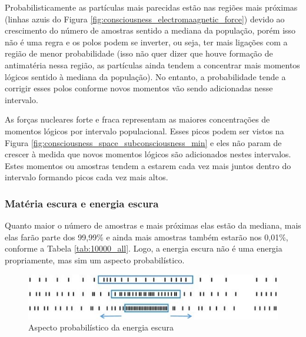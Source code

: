 Probabilisticamente as partículas mais parecidas estão nas regiões mais próximas (linhas azuis do Figura \ref{fig:consciousness_electromaagnetic_force}) devido ao crescimento do número de amostras sentido a mediana da população, porém isso não é uma regra e os polos podem se inverter, ou seja, ter mais ligações com a região de menor probabilidade (isso não quer dizer que houve formação de antimatéria nessa região, as partículas ainda tendem a concentrar mais momentos lógicos sentido à mediana da população). No entanto, a probabilidade tende a corrigir esses polos conforme novos momentos vão sendo adicionadas nesse intervalo.

As forças nucleares forte e fraca representam as maiores concentrações de momentos lógicos por intervalo populacional. Esses picos podem ser vistos na Figura \ref{fig:consciousness_space_subconsciousness_min} e eles não param de crescer à medida que novos momentos lógicos são adicionados nestes intervalos. Estes momentos ou amostras tendem a estarem cada vez mais juntos dentro do intervalo formando picos cada vez mais altos.

\subsubsection{Matéria escura e energia escura}
Quanto maior o número de amostras e mais próximas elas estão da mediana, mais elas farão parte dos 99,99\% e ainda mais amostras também estarão nos 0,01\%, conforme a Tabela \ref{tab:10000_all}. Logo, a energia escura não é uma energia propriamente, mas sim um aspecto probabilístico. 
	\begin{figure}[H]
	\caption{Aspecto probabilístico da energia escura}
	\label{fig:consciousness_dark_matter_dark_energy}
	\centering
	\includegraphics[scale=1]{sections/images/consciousness_dark_matter_dark_energy.jpg}
	\end{figure}

